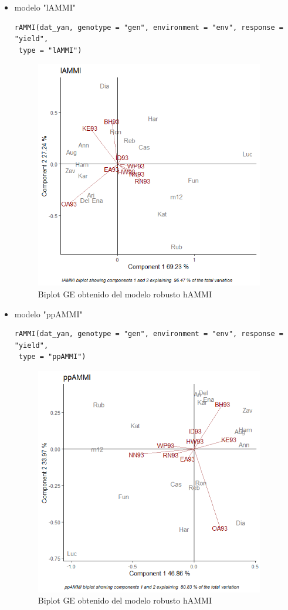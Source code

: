 \begin{itemize}
\item  modelo "lAMMI"

\begin{lstlisting}
rAMMI(dat_yan, genotype = "gen", environment = "env", response = "yield",
 type = "lAMMI")
\end{lstlisting}


\begin{figure}[h!]
	\begin{center}
		\includegraphics[width=10cm]{./Graficos/lAMMI.png}
	\end{center}
	\caption{Biplot GE obtenido del modelo robusto hAMMI}
\end{figure}


\item  modelo "ppAMMI"
\begin{lstlisting}
rAMMI(dat_yan, genotype = "gen", environment = "env", response = "yield",
 type = "ppAMMI")
\end{lstlisting}


\begin{figure}[h!]
	\begin{center}
		\includegraphics[width=10cm]{./Graficos/ppAMMI.png}
	\end{center}
	\caption{Biplot GE obtenido del modelo robusto hAMMI}
\end{figure}

\end{itemize}

